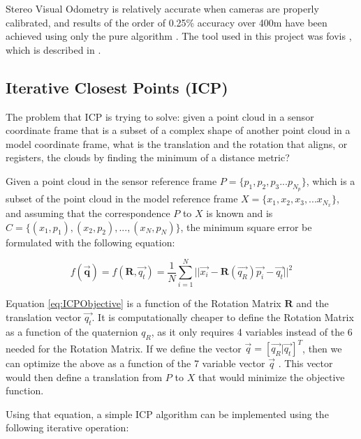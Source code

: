 \documentclass[12pt]{article}
\begin{document}
Stereo Visual Odometry is relatively accurate when cameras are properly calibrated, and results of the order of 0.25\% accuracy over 400m have been achieved using only the pure algorithm \cite{StereoVis1}. The tool used in this project was fovis \cite{fovis}, which is described in \cite{VisualOdometry}.
	
	\subsection{Iterative Closest Points (ICP)}

The problem that ICP is trying to solve: given a point cloud in a sensor coordinate frame that is a subset of a complex shape of another point cloud in a model coordinate frame, what is the translation and the rotation that aligns, or registers, the clouds by finding the minimum of a distance metric?
	
Given a point cloud in the sensor reference frame $P = \{p_1, p_2, p_3 ... p_{N_p}\}$, which is a subset of the point cloud in the model reference frame $X = \{x_1, x_2, x_3, ... x_{N_x}\}$, and assuming that the correspondence $P$ to $X$ is known and is $C = \{(x_1,p_1), (x_2,p_2), ... , (x_N, p_N)\}$, the minimum square error be formulated with the following equation:
	
\begin{equation}
f(\mathbf{\overrightarrow{q}}) = f(\mathbf{R},\overrightarrow{q_t}) = \frac{1}{N}\sum_{i=1}^{N}{||\overrightarrow{x_i}-\mathbf{R}(\overrightarrow{q_R})\overrightarrow{p_i}-\overrightarrow{q_t}||^{2}} 	
\label{eq:ICPObjective}
\end{equation}		
	
Equation \ref{eq:ICPObjective} is a function of the Rotation Matrix $\mathbf{R}$ and the translation vector $\overrightarrow{q_t}$. It is computationally cheaper to define the Rotation Matrix as a function of the quaternion $q_R$, as it only requires 4 variables instead of the 6 needed for the Rotation Matrix. If we define the vector $\overrightarrow{q} = [\overrightarrow{q_R} | \overrightarrow{q_t}]^T$, then we can optimize the above as a function of the 7 variable vector $\overrightarrow{q}$ \cite{AMethodRegistration}. This vector would then define a translation from $P$ to $X$ that would minimize the objective function.
	
Using that equation, a simple ICP algorithm can be implemented using the following iterative operation:
\end{document}
